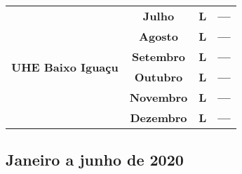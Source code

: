 \documentclass[a4paper,12pt]{article}
\begin{document}
\begin{table}[!hbt]
\begin{center}
\begin{tabular}{lccc}
\hline\multirow{6}{*}{\textbf{UHE Baixo Iguaçu}} & \textbf{Julho} & \textbf{L} & \textbf{---} \\
            & \textbf{Agosto} & \textbf{L} & \textbf{{---}} \\
            & \textbf{Setembro} & \textbf{L} & \textbf{{---}} \\
            & \textbf{Outubro} & \textbf{L} & \textbf{{---}} \\
            & \textbf{Novembro} & \textbf{L} & \textbf{{---}} \\
            & \textbf{Dezembro} & \textbf{L} & \textbf{{---}} \\
\hline
\end{tabular}
\end{center}
\end{table}

\newpage
\subsection{Janeiro a junho de 2020}
\end{document}

